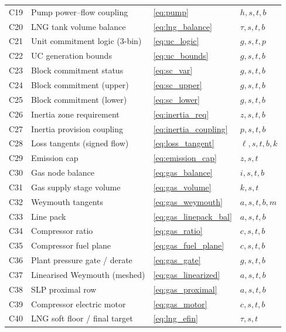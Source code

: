 \begin{table}[t]
\begin{tabular}{@{}clll@{}}
C19 & Pump power--flow coupling     & \eqref{eq:pump}             & $h,s,t,b$ \\
C20 & LNG tank volume balance       & \eqref{eq:lng_balance}      & $\tau,s,t,b$ \\
C21 & Unit commitment logic (3-bin) & \eqref{eq:uc_logic}         & $g,s,t,p$ \\
C22 & UC generation bounds          & \eqref{eq:uc_bounds}        & $g,s,t,b$ \\
C23 & Block commitment status       & \eqref{eq:sc_var}           & $g,s,t,b$ \\
C24 & Block commitment (upper)      & \eqref{eq:sc_upper}         & $g,s,t,b$ \\
C25 & Block commitment (lower)      & \eqref{eq:sc_lower}         & $g,s,t,b$ \\
C26 & Inertia zone requirement      & \eqref{eq:inertia_req}      & $z,s,t,b$ \\
C27 & Inertia provision coupling    & \eqref{eq:inertia_coupling} & $p,s,t,b$ \\
C28 & Loss tangents (signed flow)   & \eqref{eq:loss_tangent}     & $\ell,s,t,b,k$ \\
C29 & Emission cap                  & \eqref{eq:emission_cap}     & $z,s,t$ \\
C30 & Gas node balance              & \eqref{eq:gas_balance}      & $i,s,t,b$ \\
C31 & Gas supply stage volume       & \eqref{eq:gas_volume}       & $k,s,t$ \\
C32 & Weymouth tangents             & \eqref{eq:gas_weymouth}     & $a,s,t,b,m$ \\
C33 & Line pack                     & \eqref{eq:gas_linepack_bal} & $a,s,t,b$ \\
C34 & Compressor ratio              & \eqref{eq:gas_ratio}        & $c,s,t,b$ \\
C35 & Compressor fuel plane         & \eqref{eq:gas_fuel_plane}   & $c,s,t,b$ \\
C36 & Plant pressure gate / derate  & \eqref{eq:gas_gate}         & $g,s,t,b$ \\
C37 & Linearised Weymouth (meshed) & \eqref{eq:gas_linearized}   & $a,s,t,b$ \\
C38 & SLP proximal row              & \eqref{eq:gas_proximal}     & $a,s,t,b$ \\
C39 & Compressor electric motor     & \eqref{eq:gas_motor}        & $c,s,t,b$ \\
C40 & LNG soft floor / final target & \eqref{eq:lng_efin}         & $\tau,s,t$ \\

\end{tabular}
\end{table}
